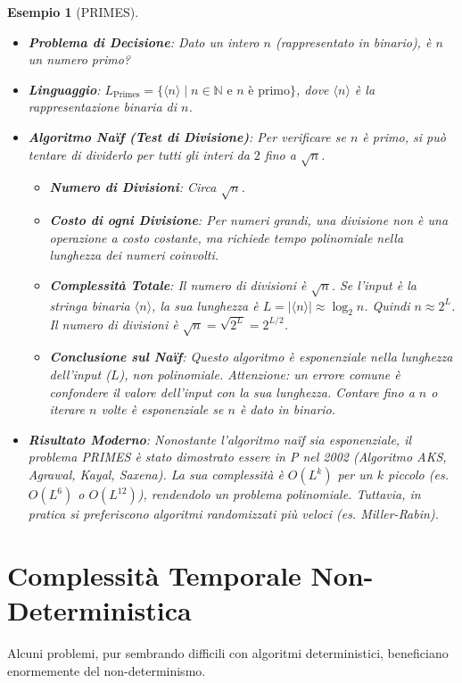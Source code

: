 \documentclass[a4paper, 11pt]{book} %
\newtheorem{example}[theorem]{Esempio}
\theoremstyle{definition}
\begin{document}
\begin{example}[PRIMES]
\begin{itemize}
    \item \textbf{Problema di Decisione}: Dato un intero $n$ (rappresentato in binario), è $n$ un numero primo?
    \item \textbf{Linguaggio}: $L_{\text{Primes}} = \{ \langle n \rangle \mid n \in \mathbb{N} \text{ e } n \text{ è primo} \}$, dove $\langle n \rangle$ è la rappresentazione binaria di $n$.
    \item \textbf{Algoritmo Naïf (Test di Divisione)}: Per verificare se $n$ è primo, si può tentare di dividerlo per tutti gli interi da $2$ fino a $\sqrt{n}$.
        \begin{itemize}
            \item \textbf{Numero di Divisioni}: Circa $\sqrt{n}$.
            \item \textbf{Costo di ogni Divisione}: Per numeri grandi, una divisione non è una operazione a costo costante, ma richiede tempo polinomiale nella lunghezza dei numeri coinvolti.
            \item \textbf{Complessità Totale}: Il numero di divisioni è $\sqrt{n}$. Se l'input è la stringa binaria $\langle n \rangle$, la sua lunghezza è $L = |\langle n \rangle| \approx \log_2 n$. Quindi $n \approx 2^L$. Il numero di divisioni è $\sqrt{n} = \sqrt{2^L} = 2^{L/2}$.
            \item \textbf{Conclusione sul Naïf}: Questo algoritmo è \emph{esponenziale} nella lunghezza dell'input ($L$), non polinomiale. \emph{Attenzione}: un errore comune è confondere il valore dell'input con la sua lunghezza. Contare fino a $n$ o iterare $n$ volte è esponenziale se $n$ è dato in binario.
        \end{itemize}
    \item \textbf{Risultato Moderno}: Nonostante l'algoritmo naïf sia esponenziale, il problema PRIMES è stato dimostrato essere in P nel 2002 (Algoritmo AKS, Agrawal, Kayal, Saxena). La sua complessità è $O(L^k)$ per un $k$ piccolo (es. $O(L^6)$ o $O(L^{12})$), rendendolo un problema polinomiale. Tuttavia, in pratica si preferiscono algoritmi randomizzati più veloci (es. Miller-Rabin).
\end{itemize}
\end{example}

\section{Complessità Temporale Non-Deterministica}
Alcuni problemi, pur sembrando difficili con algoritmi deterministici, beneficiano enormemente del non-determinismo.
\end{document}

